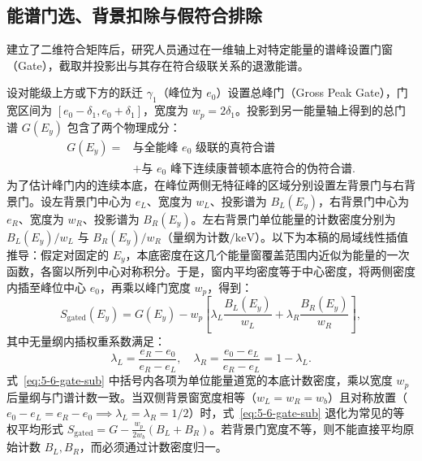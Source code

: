 \subsection{能谱门选、背景扣除与假符合排除}\label{subsec:5-6-4}

建立了二维符合矩阵后，研究人员通过在一维轴上对特定能量的谱峰设置门窗（Gate），截取并投影出与其存在符合级联关系的退激能谱。

设对能级上方或下方的跃迁 $\gamma_1$（峰位为 $e_0$）设置总峰门（Gross Peak Gate），门宽区间为 $[e_0 - \delta_1, e_0 + \delta_1]$，宽度为 $w_p = 2\delta_1$。投影到另一能量轴上得到的总门谱 $G(E_y)$ 包含了两个物理成分：
$$
\begin{aligned}
G(E_y)={}&\text{与全能峰 }e_0\text{ 级联的真符合谱}\\
&+\text{与 }e_0\text{ 峰下连续康普顿本底符合的伪符合谱}.
\end{aligned}
$$
为了估计峰门内的连续本底，在峰位两侧无特征峰的区域分别设置左背景门与右背景门。设左背景门中心为 $e_L$、宽度为 $w_L$、投影谱为 $B_L(E_y)$，右背景门中心为 $e_R$、宽度为 $w_R$、投影谱为 $B_R(E_y)$。左右背景门单位能量的计数密度分别为 $B_L(E_y)/w_L$ 与 $B_R(E_y)/w_R$（量纲为计数$/\mathrm{keV}$）。以下为本稿的局域线性插值推导：假定对固定的 $E_y$，本底密度在这几个能量窗覆盖范围内近似为能量的一次函数，各窗以所列中心对称积分。于是，窗内平均密度等于中心密度，将两侧密度内插至峰位中心 $e_0$，再乘以峰门宽度 $w_p$，得到：
\begin{equation}\label{eq:5-6-gate-sub}
S_{\mathrm{gated}}(E_y) = G(E_y) - w_p \left[ \lambda_L \frac{B_L(E_y)}{w_L} + \lambda_R \frac{B_R(E_y)}{w_R} \right],
\end{equation}
其中无量纲内插权重系数满足：
\begin{equation}\label{eq:5-6-gate-weights}
\lambda_L = \frac{e_R - e_0}{e_R - e_L}, \quad \lambda_R = \frac{e_0 - e_L}{e_R - e_L} = 1 - \lambda_L.
\end{equation}
式~\eqref{eq:5-6-gate-sub} 中括号内各项为单位能量道宽的本底计数密度，乘以宽度 $w_p$ 后量纲与门谱计数一致。当双侧背景窗宽度相等（$w_L = w_R = w_b$）且对称放置（$e_0 - e_L = e_R - e_0 \implies \lambda_L = \lambda_R = 1/2$）时，式~\eqref{eq:5-6-gate-sub} 退化为常见的等权平均形式 $S_{\mathrm{gated}} = G - \frac{w_p}{2 w_b}(B_L + B_R)$。若背景门宽度不等，则不能直接平均原始计数 $B_L, B_R$，而必须通过计数密度归一。

